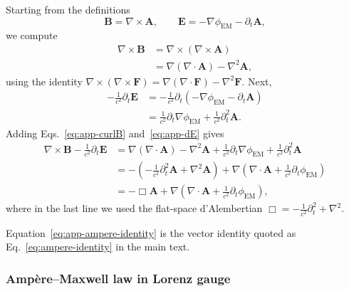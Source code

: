 \documentclass[11pt]{article}
\begin{document}
Starting from the definitions
\begin{equation}
\mathbf{B} = \nabla\times\mathbf{A},
\qquad
\mathbf{E} = -\nabla\phi_{\mathrm{EM}} - \partial_t \mathbf{A},
\end{equation}
we compute
\begin{align}
\nabla\times\mathbf{B}
&= \nabla\times(\nabla\times\mathbf{A})
\nonumber\\
&= \nabla(\nabla\cdot\mathbf{A}) - \nabla^2\mathbf{A},
\label{eq:app-curlB}
\end{align}
using the identity $\nabla\times(\nabla\times\mathbf{F}) = \nabla(\nabla\cdot\mathbf{F}) - \nabla^2 \mathbf{F}$.  Next,
\begin{align}
-\frac{1}{c^2}\partial_t\mathbf{E}
&= -\frac{1}{c^2}\partial_t\left(-\nabla\phi_{\mathrm{EM}} - \partial_t \mathbf{A}\right)
\nonumber\\
&= \frac{1}{c^2} \partial_t\nabla\phi_{\mathrm{EM}}
   + \frac{1}{c^2}\partial_t^2 \mathbf{A}.
\label{eq:app-dE}
\end{align}
Adding Eqs.~\eqref{eq:app-curlB} and~\eqref{eq:app-dE} gives
\begin{align}
\nabla\times\mathbf{B}
- \frac{1}{c^2}\partial_t\mathbf{E}
&= \nabla(\nabla\cdot\mathbf{A}) - \nabla^2\mathbf{A}
   + \frac{1}{c^2}\partial_t\nabla\phi_{\mathrm{EM}}
   + \frac{1}{c^2}\partial_t^2 \mathbf{A}
\nonumber\\
&= -\left(-\frac{1}{c^2}\partial_t^2\mathbf{A} + \nabla^2\mathbf{A}\right)
   + \nabla\left(\nabla\cdot\mathbf{A} + \frac{1}{c^2}\partial_t\phi_{\mathrm{EM}}\right)
\nonumber\\
&= -\Box \mathbf{A}
   + \nabla\left(\nabla\cdot\mathbf{A} + \frac{1}{c^2}\partial_t\phi_{\mathrm{EM}}\right),
\label{eq:app-ampere-identity}
\end{align}
where in the last line we used the flat-space d'Alembertian $\Box = -\frac{1}{c^2}\partial_t^2 + \nabla^2$.

Equation~\eqref{eq:app-ampere-identity} is the vector identity quoted as Eq.~\eqref{eq:ampere-identity} in the main text.

\subsubsection{Amp\`ere--Maxwell law in Lorenz gauge}
\end{document}
